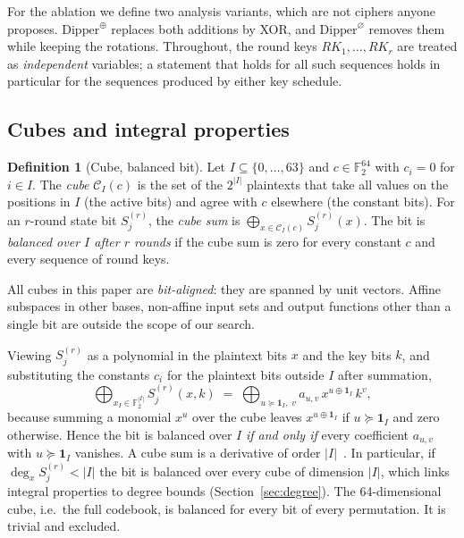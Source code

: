 \documentclass[11pt,a4paper]{article}
\theoremstyle{definition}
\newtheorem{definition}{Definition}
\theoremstyle{remark}
\newcommand{\F}{\mathbb{F}_2}
\begin{document}
For the ablation we define two analysis variants, which are not ciphers anyone proposes. $\mathrm{Dipper}^{\oplus}$ replaces both additions by XOR, and $\mathrm{Dipper}^{\varnothing}$ removes them while keeping the rotations. Throughout, the round keys $RK_1,\dots,RK_r$ are treated as \emph{independent} variables; a statement that holds for all such sequences holds in particular for the sequences produced by either key schedule.

\subsection{Cubes and integral properties}
\begin{definition}[Cube, balanced bit]
Let $I\subseteq\{0,\dots,63\}$ and $c\in\F^{64}$ with $c_i=0$ for $i\in I$. The \emph{cube} $\mathcal C_I(c)$ is the set of the $2^{|I|}$ plaintexts that take all values on the positions in $I$ (the active bits) and agree with $c$ elsewhere (the constant bits). For an $r$-round state bit $S^{(r)}_j$, the \emph{cube sum} is $\bigoplus_{x\in\mathcal C_I(c)}S^{(r)}_j(x)$. The bit is \emph{balanced over $I$ after $r$ rounds} if the cube sum is zero for every constant $c$ and every sequence of round keys.
\end{definition}
All cubes in this paper are \emph{bit-aligned}: they are spanned by unit vectors. Affine subspaces in other bases, non-affine input sets and output functions other than a single bit are outside the scope of our search.

Viewing $S^{(r)}_j$ as a polynomial in the plaintext bits $x$ and the key bits $k$, and substituting the constants $c_i$ for the plaintext bits outside $I$ after summation,
\begin{equation}\label{eq:cubesum}
\bigoplus_{x_I\in\F^{|I|}} S^{(r)}_j(x,k)\;=\;\bigoplus_{u\succeq \mathbf 1_I,\;v} a_{u,v}\,x^{u\oplus\mathbf 1_I}\,k^{v},
\end{equation}
because summing a monomial $x^u$ over the cube leaves $x^{u\oplus\mathbf 1_I}$ if $u\succeq\mathbf 1_I$ and zero otherwise. Hence the bit is balanced over $I$ \emph{if and only if} every coefficient $a_{u,v}$ with $u\succeq\mathbf 1_I$ vanishes. A cube sum is a derivative of order $|I|$~\cite{lai1994}. In particular, if $\deg_x S^{(r)}_j<|I|$ the bit is balanced over every cube of dimension $|I|$, which links integral properties to degree bounds (Section~\ref{sec:degree}). The 64-dimensional cube, i.e.\ the full codebook, is balanced for every bit of every permutation. It is trivial and excluded.
\end{document}
